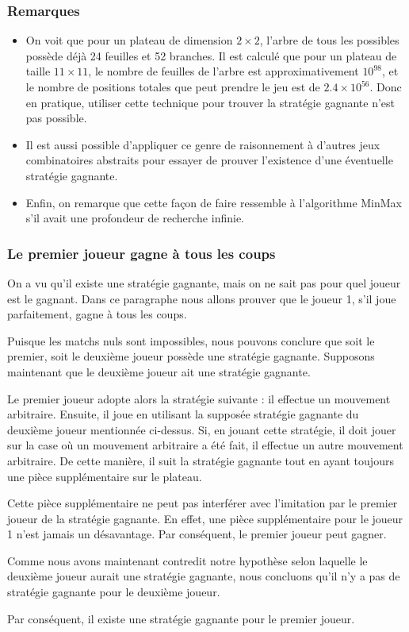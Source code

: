 \subsubsection{Remarques}
\begin{itemize}
    \item On voit que pour un plateau de dimension $2\times2$, l'arbre de tous les possibles possède déjà 24 feuilles et 52 branches.
    Il est calculé que pour un plateau de taille $11\times11$, le nombre de feuilles de l'arbre est
    approximativement $10^{98}$, et le nombre de positions totales que peut prendre le jeu est de $2.4\times10^{56}$.
    Donc en pratique, utiliser cette technique pour trouver la stratégie gagnante n'est pas possible.
    \item Il est aussi possible d'appliquer ce genre de raisonnement à d'autres jeux combinatoires abstraits pour essayer de
    prouver l'existence d'une éventuelle stratégie gagnante.
    \item Enfin, on remarque que cette façon de faire ressemble à l'algorithme MinMax s'il avait une profondeur de recherche
    infinie.
\end{itemize}

\subsubsection{Le premier joueur gagne à tous les coups}
On a vu qu'il existe une stratégie gagnante, mais on ne sait pas pour quel joueur est le gagnant. Dans ce paragraphe nous allons
prouver que le joueur 1, s'il joue parfaitement, gagne à tous les coups.

Puisque les matchs nuls sont impossibles, nous pouvons conclure que soit le premier, soit le deuxième joueur possède une stratégie
gagnante. Supposons maintenant que le deuxième joueur ait une stratégie gagnante.

Le premier joueur adopte alors la stratégie suivante : il effectue un mouvement arbitraire. Ensuite, 
il joue en utilisant la supposée stratégie gagnante du deuxième joueur mentionnée ci-dessus. Si,
en jouant cette stratégie, il doit jouer sur la case où un mouvement arbitraire a été fait, il effectue
un autre mouvement arbitraire. De cette manière, il suit la stratégie gagnante tout en ayant toujours une pièce
supplémentaire sur le plateau.

Cette pièce supplémentaire ne peut pas interférer avec l'imitation par le premier joueur de la stratégie gagnante.
En effet, une pièce supplémentaire pour le joueur 1 n'est jamais un désavantage. Par conséquent, le premier joueur peut
gagner.

Comme nous avons maintenant contredit notre hypothèse selon laquelle le deuxième joueur aurait une stratégie gagnante,
nous concluons qu'il n'y a pas de stratégie gagnante pour le deuxième joueur.

Par conséquent, il existe une stratégie gagnante pour le premier joueur.